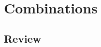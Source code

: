 
\newcommand{\laClass}       {CS 211}
\newcommand{\laSemester}    {Spring 2018}
\newcommand{\laChapter}     {5.3}
\newcommand{\laType}        {Exercise}
\newcommand{\laPoints}      {5}
\newcommand{\laTitle}       {Combinations}
\newcommand{\laDate}        {Jan 23, 2018}
\setcounter{chapter}{5}
\setcounter{section}{3}
\addtocounter{section}{-1}

\toggletrue{answerkey}
\togglefalse{answerkey}






    \section{\laTitle}

    \subsection{Review}

